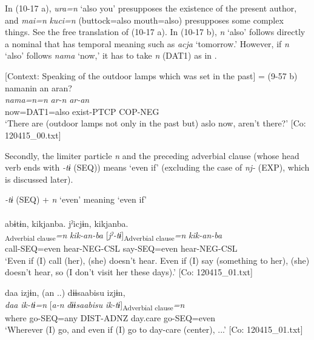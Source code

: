 In (10-17 a), \textit{ura=n} ‘also you’ presupposes the existence of the present author, and \textit{mai=n} \textit{kuci=n} (buttock=also mouth=also) presupposes some complex things. See the free translation of (10-17 a). In (10-17 b), \textit{n} ‘also’ follows directly a nominal that has temporal meaning such as \textit{acja} ‘tomorrow.’ However, if \textit{n} ‘also’ follows \textit{nama} ‘now,’ it has to take \textit{n} (DAT1) as in .

\ea\label{ex:10.18}   [Context: Speaking of the outdoor lamps which was set in the past] = (9-57 b)\\
      \glll    namanin  an  aran?\\
    \textit{nama=n=n}  \textit{ar-n}  \textit{ar-an}\\
    now=DAT1=also  exist-PTCP  COP-NEG\\
\glt     ‘There are (outdoor lamps not only in the past but) aslo now, aren’t there?’  [Co: 120415\_00.txt]
\z

  Secondly, the limiter particle \textit{n} and the preceding adverbial clause (whose head verb ends with \textit{{}-tɨ} (SEQ)) means ‘even if’ (excluding the case of \textit{nj-} (EXP), which is discussed later).

\ea\label{ex:10.19}   \textit{{}-tɨ} (SEQ) + \textit{n} ‘even’ meaning ‘even if’\\
  \ea\relax  [= (8-103)]\\
      \glll    abɨtɨn,  kikjanba.  jˀicjɨn,  kikjanba.\\
      [\textit{abɨr-tɨ}]\textsubscript{Adverbial clause}\textit{=n}  \textit{kik-an-ba}  [\textit{jˀ-tɨ}]\textsubscript{Adverbial clause}\textit{=n}  \textit{kik-an-ba}\\
      call-SEQ=even  hear{}-NEG-CSL  say-SEQ=even  hear{}-NEG-CSL\\
      \glt       ‘Even if (I) call (her), (she) doesn’t hear. Even if (I) say (something to her), (she) doesn’t hear, so (I don’t visit her these days).’ [Co: 120415\_01.txt]

  \ex  %
      \glll    daa  izjɨn,  {(an ..)}  {\textbar}dɨɨsaabisu{\textbar}  izjɨn,\\
      \textit{daa}  \textit{ik-tɨ=n}  [\textit{a-n}  \textit{dɨɨsaabisu}  \textit{ik-tɨ}]\textsubscript{Adverbial clause}\textit{=n}\\
      where  go-SEQ=any  DIST-ADNZ  day.care  go-SEQ=even\\
      \glt       ‘Wherever (I) go, and even if (I) go to day-care (center), ...’ [Co: 120415\_01.txt]
    \z
\z

